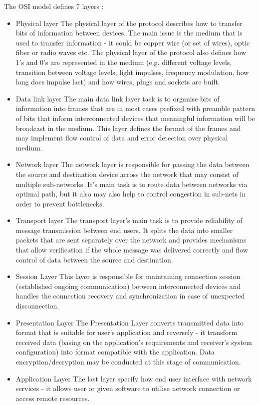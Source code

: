\documentclass[magisterska,en]{pracamgr}
\begin{document}
The OSI model defines 7 layers \cite{OSI_article1, OSI_article2}:
\begin{itemize}
 \item Physical layer
 The physical layer of the protocol describes how to transfer bits of information between devices. The main issue is the medium that is used to transfer information - it could be copper wire (or set of wires), optic fiber or radio waves etc. The physical layer of the protocol also defines how 1's and 0's are represented in the medium (e.g. different voltage levels, transition between voltage levels, light impulses, frequency modulation, how long does impulse last) and how wires, plugs and sockets are built.
 \item Data link layer
 The main data link layer task is to organise bits of information into frames that are in most cases prefixed with preamble pattern of bits that inform interconnected devices that meaningful information will be broadcast in the medium. This layer defines the format of the frames and may implement flow control of data and error detection over physical medium.
 \item Network layer
 The network layer is responsible for passing the data between the source and destination device across the network that may consist of multiple sub-networks. It's main task is to route data between networks via optimal path, but it also may also help to control congestion in sub-nets in order to prevent bottlenecks.
 \item Transport layer
 The transport layer's main task is to provide reliability of message transmission between end users. It splits the data into smaller packets that are sent separately over the network and provides mechanisms that allow verification if the whole message was delivered correctly and flow control of data between the source and destination.
 \item Session Layer
 This layer is responsible for maintaining connection session (established ongoing communication) between interconnected devices and handles the connection recovery and synchronization in case of unexpected disconnection.
 \item Presentation Layer
 The Presentation Layer converts transmitted data into format that is suitable for user's application and reversely - it transform received data (basing on the application's requirements and receiver's system configuration) into format compatible with the application. Data encryption/decryption may be conducted at this stage of communication.
 \item Application Layer
 The last layer specify how end user interface with network services - it allows user or given software to utilise network connection or access remote resources. 
 
\end{itemize}
\end{document}
